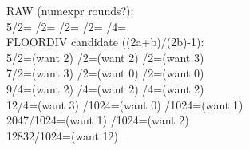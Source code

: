 \documentclass{article}
\begin{document}
\ttfamily\small
RAW (numexpr rounds?):\\
5/2= /2= /2= /2= /4=\\[1ex]
FLOORDIV candidate ((2a+b)/(2b)-1):\\
5/2=(want 2) /2=(want 2) /2=(want 3)\\
7/2=(want 3) /2=(want 0) /2=(want 0)\\
9/4=(want 2) /4=(want 2) /4=(want 2)\\
12/4=(want 3) /1024=(want 0) /1024=(want 1)\\
2047/1024=(want 1) /1024=(want 2)\\
12832/1024=(want 12)\\
\end{document}
